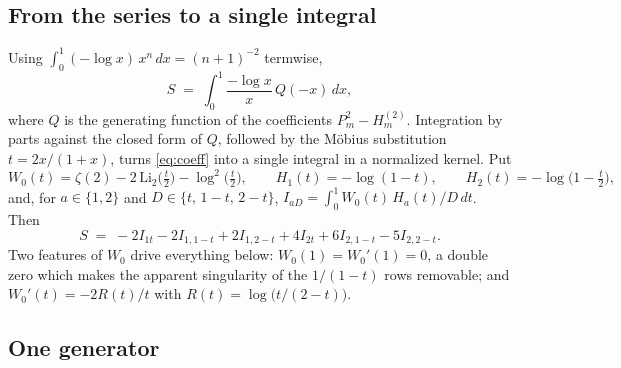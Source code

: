 \documentclass[11pt]{article}
\begin{document}
\subsection{From the series to a single integral}

Using $\int_0^1 (-\log x)\,x^{n}\,dx = (n+1)^{-2}$ termwise,
\begin{equation}\label{eq:coeff}
S \;=\; \int_0^1 \frac{-\log x}{x}\,Q(-x)\,dx,
\end{equation}
where $Q$ is the generating function of the coefficients
$P_m^2 - H_m^{(2)}$.  Integration by parts against the closed form of
$Q$, followed by the M\"obius substitution $t = 2x/(1+x)$, turns
\eqref{eq:coeff} into a single integral in a normalized kernel.  Put
\[
W_0(t) = \zeta(2) - 2\,\mathrm{Li}_2\!\bigl(\tfrac t2\bigr) - \log^2\!\bigl(\tfrac t2\bigr),
\qquad
H_1(t) = -\log(1-t), \qquad H_2(t) = -\log\!\bigl(1 - \tfrac t2\bigr),
\]
and, for $a \in \{1,2\}$ and $D \in \{t,\,1-t,\,2-t\}$,
$I_{aD} = \int_0^1 W_0(t)\,H_a(t)/D\,dt$.  Then
\begin{equation}\label{eq:six}
S \;=\; -2I_{1t} - 2I_{1,1-t} + 2I_{1,2-t}
        + 4I_{2t} + 6I_{2,1-t} - 5I_{2,2-t}.
\end{equation}
Two features of $W_0$ drive everything below: $W_0(1) = W_0'(1) = 0$, a
double zero which makes the apparent singularity of the $1/(1-t)$ rows
removable; and $W_0'(t) = -2R(t)/t$ with $R(t) = \log\bigl(t/(2-t)\bigr)$.

\subsection{One generator}
\end{document}
